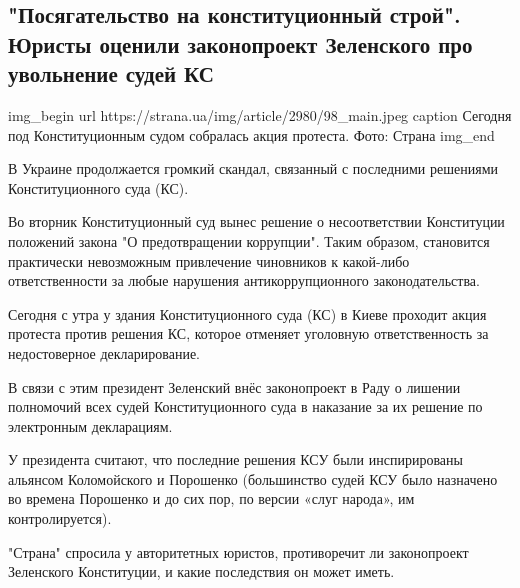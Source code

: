  
 
 

\subsection{"Посягательство на конституционный строй". Юристы оценили законопроект Зеленского про увольнение судей КС}



\ifcmt
img_begin 
	url https://strana.ua/img/article/2980/98_main.jpeg
	caption Сегодня под Конституционным судом собралась акция протеста. Фото: Страна 
img_end
\fi

В Украине продолжается громкий скандал, связанный с последними решениями
Конституционного суда (КС). 

Во вторник Конституционный суд вынес решение о несоответствии Конституции
положений закона "О предотвращении коррупции". Таким образом, становится
практически невозможным привлечение чиновников к какой-либо
ответственности за любые нарушения антикоррупционного законодательства.
 
Сегодня с утра у здания Конституционного суда (КС) в Киеве проходит акция
протеста против решения КС, которое отменяет уголовную ответственность за
недостоверное декларирование.
 
В связи с этим президент Зеленский внёс законопроект в Раду о лишении
полномочий всех судей Конституционного суда в наказание за их решение по
электронным декларациям.
 
У президента считают, что последние решения КСУ были инспирированы
альянсом Коломойского и Порошенко (большинство судей КСУ было назначено во
времена Порошенко и до сих пор, по версии «слуг народа», им
контролируется).
 
"Страна" спросила у авторитетных юристов, противоречит ли законопроект
Зеленского Конституции, и какие последствия он может иметь.

